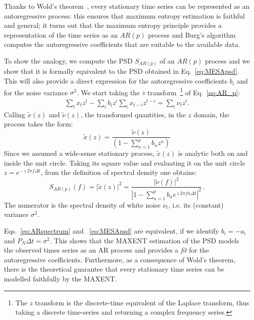 \documentclass[twocolumn,showpacs,preprintnumbers,nofootinbib,prd,
superscriptaddress,10pt]{revtex4-1}
\begin{document}
Thanks to Wold's theorem~\cite{Wold_theorem}, every stationary time series can be represented as an autoregressive process: this ensures that maximum entropy estimation is faithful and general; it turns out that the maximum entropy principle provides a representation of the time series as an $AR(p)$ process and Burg's algorithm computes the autoregressive coefficients that are suitable to the available data.

To show the analogy, we compute the PSD $S_{AR(p)}$ of an $AR(p)$ process and we show that it is formally equivalent to the PSD obtained in Eq.~\eqref{eq:MESApsd}. This will also provide a direct expression for the autoregressive coefficients $b_i$ and for the noise variance $\sigma^2$.
We start taking the $z$ transform~\footnote{The $z$ transform is the discrete-time equivalent of the Laplace transform, thus taking a discrete time-series and returning a complex frequency series.} of Eq.~\eqref{eq:AR_p}: 
\begin{align}
    \sum_t x_t z^t - \sum_i b_i z^i\sum_t x_{t - i} z^{t - i} = \sum_t \nu_t z^t.
\end{align}
Calling $\tilde x(z)$ and $\tilde \nu (z)$, the transformed quantities, 
in the $z$ domain, the process takes the form:
\begin{equation}
    \tilde x(z) = \frac{\tilde\nu(z)}{\left(1 - \sum_{n = 1}^p b_n z^n \right)}
\end{equation}
Since we assumed a wide-sense stationary process, $\tilde{x}(z)$ is analytic both on and inside the unit circle. Taking its square value and evaluating it on the unit circle $z = e^{-\imath 2 \pi f \Delta t}$, from the definition of spectral density one obtains:
\begin{equation}\label{eq:ARspectrum}
    S_{AR(p)}(f) = \vert \tilde x(z)\vert ^ 2 = 
    \frac{\vert \tilde \nu(f) \vert ^ 2}{\left\vert 1 - \sum_{n = 1}^p b_n e^{\imath 2 \pi f n \Delta t} \right\vert ^ 2}\,.
\end{equation}
The numerator is the spectral density of white noise $\nu_t$, i.e. its (constant) variance $\sigma^2$.

Eqs.~\eqref{eq:ARspectrum} and ~\eqref{eq:MESApsd} are equivalent, if we identify $b_i = - a_i$ and $P_N \Delta t= \sigma ^ 2$.
This shows that the MAXENT estimation of the PSD models the observed times series as an AR process and provides a {\it fit} for the autoregressive coefficients.
Furthermore, as a consequence of Wold's theorem, there is the theoretical guarantee that every stationary time series can be modelled faithfully by the MAXENT.
\end{document}
